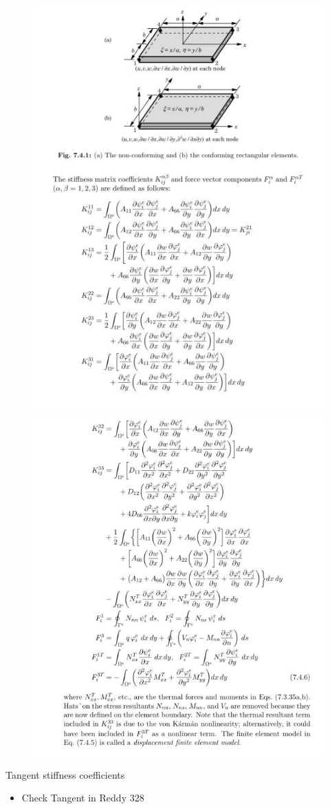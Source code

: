 	\begin{frame}
		\begin{figure}
			\centering
			\includegraphics[width=0.4\linewidth]{Figure/fig40}  		
			\includegraphics[width=0.4\linewidth]{Figure/fig41}
		\end{figure}
	\end{frame}


	\begin{frame}{Tangent stiffness coefficients}
		\begin{itemize}
			\item Check Tangent in Reddy 328
		\end{itemize}
	\end{frame}



